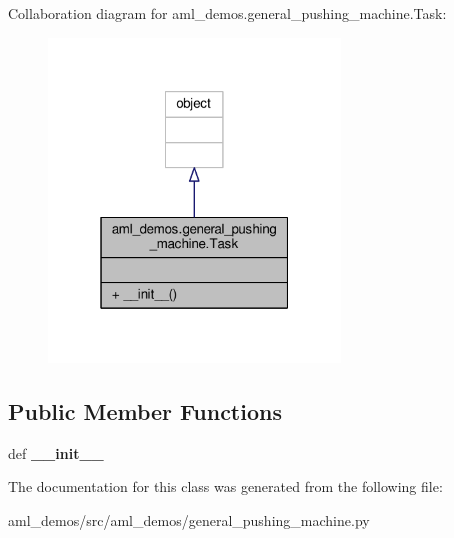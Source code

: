 Collaboration diagram for aml\-\_\-demos.\-general\-\_\-pushing\-\_\-machine.\-Task\-:\nopagebreak
\begin{figure}[H]
\begin{center}
\leavevmode
\includegraphics[width=220pt]{classaml__demos_1_1general__pushing__machine_1_1_task__coll__graph}
\end{center}
\end{figure}
\subsection*{Public Member Functions}
\begin{DoxyCompactItemize}
\item 
\hypertarget{classaml__demos_1_1general__pushing__machine_1_1_task_abfe4befda19fbe9dacaba32ed17d2b1c}{def {\bfseries \-\_\-\-\_\-init\-\_\-\-\_\-}}\label{classaml__demos_1_1general__pushing__machine_1_1_task_abfe4befda19fbe9dacaba32ed17d2b1c}

\end{DoxyCompactItemize}


The documentation for this class was generated from the following file\-:\begin{DoxyCompactItemize}
\item 
aml\-\_\-demos/src/aml\-\_\-demos/general\-\_\-pushing\-\_\-machine.\-py\end{DoxyCompactItemize}
